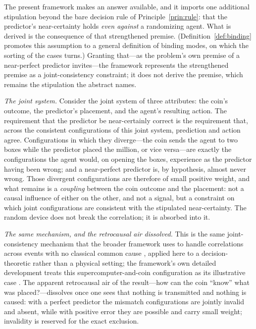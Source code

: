 The present framework makes an answer available, and it imports one additional stipulation beyond the bare decision rule of Principle~\ref{prin:rule}: that the predictor's near-certainty holds \emph{even against} a randomizing agent. What is derived is the consequence of that strengthened premise. (Definition~\ref{def:binding} promotes this assumption to a general definition of binding modes, on which the sorting of the cases turns.) Granting that---as the problem's own premise of a near-perfect predictor invites---the framework represents the strengthened premise as a joint-consistency constraint; it does not derive the premise, which remains the stipulation the abstract names.

\textit{The joint system.} Consider the joint system of three attributes: the coin's outcome, the predictor's placement, and the agent's resulting action. The requirement that the predictor be near-certainly correct is the requirement that, across the consistent configurations of this joint system, prediction and action agree. Configurations in which they diverge---the coin sends the agent to two boxes while the predictor placed the million, or vice versa---are exactly the configurations the agent would, on opening the boxes, experience as the predictor having been wrong; and a near-perfect predictor is, by hypothesis, almost never wrong. Those divergent configurations are therefore of small positive weight, and what remains is a \emph{coupling} between the coin outcome and the placement: not a causal influence of either on the other, and not a signal, but a constraint on which joint configurations are consistent with the stipulated near-certainty. The random device does not break the correlation; it is absorbed into it.

\textit{The same mechanism, and the retrocausal air dissolved.} This is the same joint-consistency mechanism that the broader framework uses to handle correlations across events with no classical common cause \cite{Aethus}, applied here to a decision-theoretic rather than a physical setting; the framework's own detailed development treats this supercomputer-and-coin configuration as its illustrative case \cite{Aethus}. The apparent retrocausal air of the result---how can the coin ``know'' what was placed?---dissolves once one sees that nothing is transmitted and nothing is caused: with a perfect predictor the mismatch configurations are jointly invalid and absent, while with positive error they are possible and carry small weight; invalidity is reserved for the exact exclusion.



